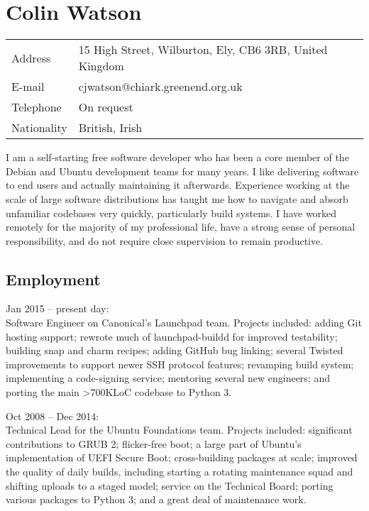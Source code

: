 \documentclass[a4paper,12pt]{report}
\begin{document}
    \section*{\centering Colin Watson}

    \begin{tabular}{l l}
        Address & 15 High Street, Wilburton, Ely, CB6 3RB, United Kingdom \\
        E-mail & cjwatson@chiark.greenend.org.uk \\
        Telephone & On request \\
        Nationality & British, Irish \\
    \end{tabular}

    \addvspace{1em}

    I am a self-starting free software developer who has been a core member of
    the Debian and Ubuntu development teams for many years. I like delivering
    software to end users and actually maintaining it afterwards. Experience
    working at the scale of large software distributions has taught me how to
    navigate and absorb unfamiliar codebases very quickly, particularly build
    systems. I have worked remotely for the majority of my professional life,
    have a strong sense of personal responsibility, and do not require close
    supervision to remain productive.

    \subsection*{Employment}

    Jan 2015 -- present day: \nopagebreak\\
    Software Engineer on Canonical's Launchpad team. Projects included: adding
    Git hosting support; rewrote much of launchpad-buildd for improved
    testability; building snap and charm recipes; adding GitHub bug linking;
    several Twisted improvements to support newer SSH protocol features;
    revamping build system; implementing a code-signing service; mentoring
    several new engineers; and porting the main \textgreater{}700KLoC codebase
    to Python 3.

    Oct 2008 -- Dec 2014: \nopagebreak\\
    Technical Lead for the Ubuntu Foundations team. Projects included:
    significant contributions to GRUB 2; flicker-free boot; a large part of
    Ubuntu's implementation of UEFI Secure Boot; cross-building packages at
    scale; improved the quality of daily builds, including starting a rotating
    maintenance squad and shifting uploads to a staged model; service on the
    Technical Board; porting various packages to Python 3; and a great deal of
    maintenance work.
\end{document}
